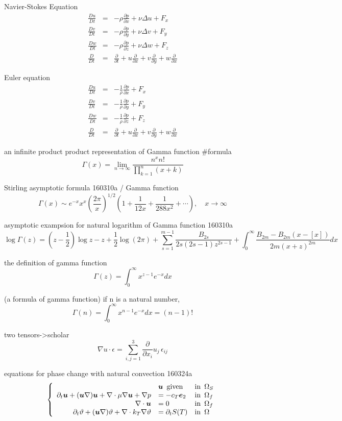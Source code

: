 Navier-Stokes Equation
$$
\begin{array}{ccc}
\frac{D u}{D t} &=& -\rho\frac{\partial p}{\partial x}+\nu\Delta u+F_x \\
\frac{D v}{D t} &=& -\rho\frac{\partial p}{\partial y}+\nu\Delta v+F_y \\
\frac{D w}{D t} &=& -\rho\frac{\partial p}{\partial z}+\nu\Delta w+F_z \\
\frac{D }{D t} &=& \frac{\partial}{\partial t}+u\frac{\partial}{\partial x}+v\frac{\partial}{\partial y}+w\frac{\partial}{\partial x}
\end{array}
$$

Euler equation
$$
\begin{array}{ccl}
\frac{D u}{D t} &=& -\frac{1}{\rho}\frac{\partial p}{\partial x}+F_x \\
\frac{D v}{D t} &=& -\frac{1}{\rho}\frac{\partial p}{\partial y}+F_y \\
\frac{D w}{D t} &=& -\frac{1}{\rho}\frac{\partial p}{\partial z}+F_z \\
\frac{D }{D t} &=& \frac{\partial}{\partial t}+u\frac{\partial}{\partial x}+v\frac{\partial}{\partial y}+w\frac{\partial}{\partial x}
\end{array}
$$

an infinite product product representation of Gamma function #formula 
$$
\Gamma(x)=\displaystyle\lim_{n\rightarrow\infty}\frac{\displaystyle n^x n!}{\displaystyle\prod^n_{k=1}(x+k)}
$$

Stirling asymptotic formula 160310a / Gamma function
$$
\Gamma(x) \sim e^{-x} x^x \left(\frac{2\pi}{x}\right)^{1/2}\left(1+\frac{1}{12x}+\frac{1}{288x^2}+\cdots\right), \quad x\rightarrow\infty
$$

asymptotic exampsion for natural logarithm of Gamma function 160310a
$$
\log \Gamma(z) = \left(z-\frac{1}{2}\right)\log z -z+\frac{1}{2}\log(2\pi)+\sum^{m-1}_{s=1}\frac{B_{2s}}{2s(2s-1)z^{2s-1}}+\int^\infty_0\frac{B_{2m}-B_{2m}(x-[x])}{2m(x+z)^{2m}}dx
$$

the definition of gamma function
$$
\Gamma(z)=\int^\infty_0 x^{z-1}e^{-x} dx
$$

(a formula of gamma function) if n is a natural number, 
$$
\Gamma(n)=\int^\infty_0 x^{n-1}e^{-x} dx=(n-1)!
$$

two tensors->scholar	
$$
\nabla u\cdot\epsilon=\sum^3_{i,j=1}\frac{\partial}{\partial x_i} u_j \,\epsilon_{ij}
$$

equations for phase change with natural convection 160324a
$$
\left\{
\begin{array}{rllll}
&{\boldsymbol u}\,\,\,{\rm given}&{\rm in}\,\,\,\Omega_S \\
\partial_t {\boldsymbol u}+({\boldsymbol u}\nabla){\boldsymbol u}+\nabla\cdot\mu\nabla{\boldsymbol u}+\nabla p&=-c_T {\boldsymbol e}_2&{\rm in}\,\,\,\Omega_f \\
\nabla \cdot {\boldsymbol u}&=0 &{\rm in}\,\,\,\Omega_f \\
\partial_t {\vartheta}+({\boldsymbol u}\nabla){\vartheta}+\nabla\cdot k_T\nabla {\vartheta}&=\partial_t S(T)&{\rm in}\,\,\,\Omega
\end{array}
\right.
$$

